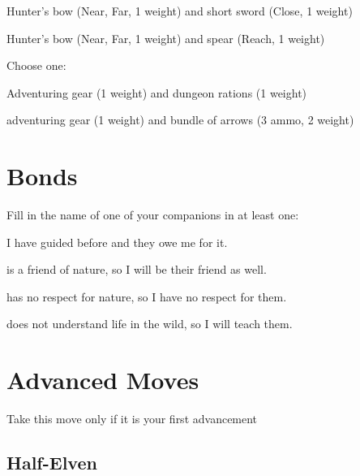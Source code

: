 \item Hunter's bow (Near, Far, 1 weight) and short sword (Close, 1 weight)

           
\item Hunter's bow (Near, Far, 1 weight) and spear (Reach, 1 weight)

         
\stopitemize
         

Choose one:

         
\startitemize[1,packed]
           
\item Adventuring gear (1 weight) and dungeon rations (1 weight)

           
\item adventuring gear (1 weight) and bundle of arrows (3 ammo, 2 weight)

         
\stopitemize
       

       
\section{Bonds}   
       

         

Fill in the name of one of your companions in at least one:

         

I have guided \thinrules[n=2] before and they owe me for it.

         

\thinrules[n=2] is a friend of nature, so I will be their friend as well.

         

\thinrules[n=2] has no respect for nature, so I have no respect for them.

         

\thinrules[n=2] does not understand life in the wild, so I will teach them.

       

       
\section{Advanced Moves}    
       

         
\startInstructionsAfterHeader
Take this move only if it is your first advancement
\stopInstructionsAfterHeader
         
\subsection{Half-Elven}   
         

